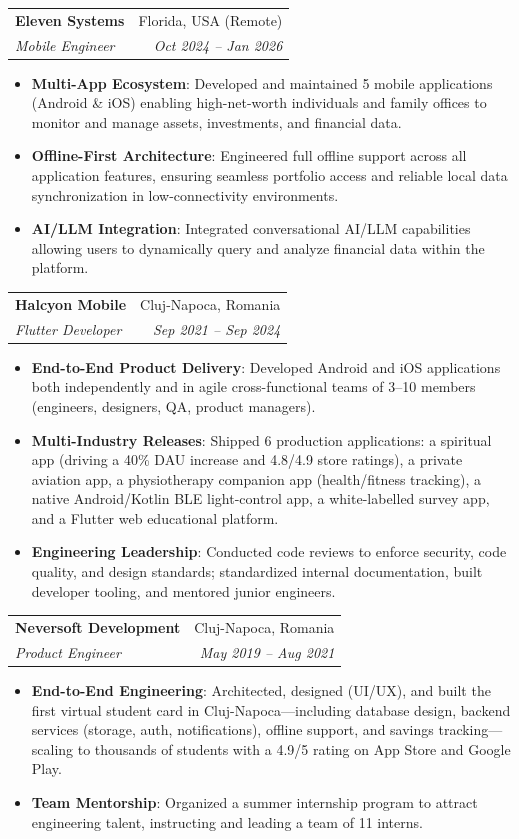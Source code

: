 \documentclass[letterpaper,11pt]{article}
\makeatletter
\newcommand{\resumeItem}[2]{
  \item\small{
    \textbf{#1}{: #2 \vspace{-2pt}}
  }
}
\newcommand{\resumeSubheading}[4]{
  \vspace{-1pt}\item
    \begin{tabular*}{0.97\textwidth}[t]{l@{\extracolsep{\fill}}r}
      \textbf{#1} & #2 \\
      \textit{\small #3} & \textit{\small #4} \\
    \end{tabular*}\vspace{-5pt}
}
\newcommand{\resumeItemListStart}{\begin{itemize}}
\newcommand{\resumeItemListEnd}{\end{itemize}\vspace{-5pt}}
\makeatother
\begin{document}
    \resumeSubheading
      {Eleven Systems \normalfont{\small{(Wealth Management \& Family Office Platforms)}}}{Florida, USA (Remote)}
      {Mobile Engineer}{Oct 2024 -- Jan 2026}
      \resumeItemListStart
        \resumeItem{Multi-App Ecosystem}
          {Developed and maintained 5 mobile applications (Android \& iOS) enabling high-net-worth individuals and family offices to monitor and manage assets, investments, and financial data.}
        \resumeItem{Offline-First Architecture}
          {Engineered full offline support across all application features, ensuring seamless portfolio access and reliable local data synchronization in low-connectivity environments.}
        \resumeItem{AI/LLM Integration}
          {Integrated conversational AI/LLM capabilities allowing users to dynamically query and analyze financial data within the platform.}
      \resumeItemListEnd

    \resumeSubheading
      {Halcyon Mobile \normalfont{\small{(Mobile \& Web Software Consultancy)}}}{Cluj-Napoca, Romania}
      {Flutter Developer}{Sep 2021 -- Sep 2024}
      \resumeItemListStart
        \resumeItem{End-to-End Product Delivery}
          {Developed Android and iOS applications both independently and in agile cross-functional teams of 3--10 members (engineers, designers, QA, product managers).}
        \resumeItem{Multi-Industry Releases}
          {Shipped 6 production applications: a spiritual app (driving a 40\% DAU increase and 4.8/4.9 store ratings), a private aviation app, a physiotherapy companion app (health/fitness tracking), a native Android/Kotlin BLE light-control app, a white-labelled survey app, and a Flutter web educational platform.}
        \resumeItem{Engineering Leadership}
          {Conducted code reviews to enforce security, code quality, and design standards; standardized internal documentation, built developer tooling, and mentored junior engineers.}
      \resumeItemListEnd

    \resumeSubheading
      {Neversoft Development \normalfont{\small{(Digital Products \& Software Services)}}}{Cluj-Napoca, Romania}
      {Product Engineer}{May 2019 -- Aug 2021}
      \resumeItemListStart
        \resumeItem{End-to-End Engineering}
          {Architected, designed (UI/UX), and built the first virtual student card in Cluj-Napoca---including database design, backend services (storage, auth, notifications), offline support, and savings tracking---scaling to thousands of students with a 4.9/5 rating on App Store and Google Play.}
        \resumeItem{Team Mentorship}
          {Organized a summer internship program to attract engineering talent, instructing and leading a team of 11 interns.}
      \resumeItemListEnd
\end{document}
